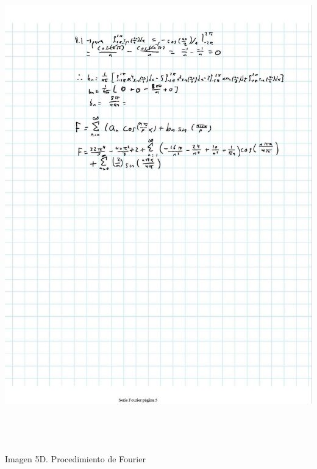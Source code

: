 \includegraphics[width=6.26772in,height=8.11111in]{media/image58.jpg}

Imagen 5D. Procedimiento de Fourier
